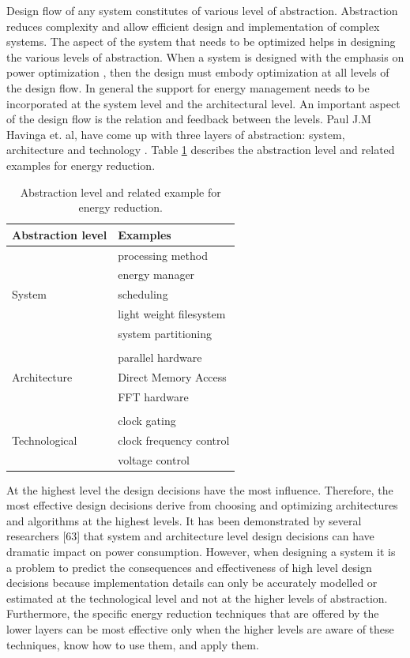  Design flow of any system constitutes of various level of abstraction. Abstraction reduces complexity  and allow efficient design and implementation of complex systems. The aspect of the system that needs to be optimized helps in designing the various levels of abstraction. When a system is designed with the emphasis on power optimization , then the design must embody optimization at all levels of the design flow. In general the support for energy management needs to be incorporated at the system level and the architectural level. An important aspect of the design flow is the relation and feedback between the levels. Paul J.M Havinga et. al, 
 have come up with three layers of abstraction: system, architecture and technology \cite{havinga,havinga2,havinga3}. Table \ref{table:abstraction} describes the abstraction level and related examples for energy reduction.
 \begin{table}
 	\centering
 	\begin{tabular}{|l|l|}
 		\hline
 		Abstraction level & Examples  \\
 		\hline
 		  & processing method \\
 		  & energy manager \\
 		  System & scheduling \\
 		  & light weight filesystem \\
 		  & system partitioning \\
 		  & \\
 		  & parallel hardware \\
 		  Architecture & Direct Memory Access \\
 		  & FFT hardware \\
 		  &  \\
 		  & clock gating \\
 		  Technological & clock frequency control \\
 		  & voltage control \\
 		\hline
 	\end{tabular}
 	\caption{Abstraction level and related example for energy reduction.}
 	\label{table:abstraction}
 \end{table}


 At the highest level the design decisions have the most influence. 
 Therefore, the most effective design decisions derive from choosing and optimizing 
 architectures and algorithms at the highest levels. It has been demonstrated by several 
 researchers [63] that system and architecture level design decisions can have dramatic 
 impact on power consumption. However, when designing a system it is a problem to 
 predict the consequences and effectiveness of high level design decisions because implementation details can only be accurately modelled or estimated at the technological 
 level and not at the higher levels of abstraction. Furthermore, the specific energy 
 reduction techniques that are offered by the lower layers can be most effective only 
 when the higher levels are aware of these techniques, know how to use them, and apply 
 them.
 
